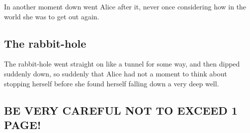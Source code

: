\documentclass[12pt]{article} %
\begin{document}
In another moment down went Alice after it, never once
considering how in the world she was to get out again.

\subsection{The rabbit-hole}

The rabbit-hole went straight on like a tunnel for some way,
and then dipped suddenly down, so suddenly that Alice had not a
moment to think about stopping herself before she found herself
falling down a very deep well.

\subsection*{BE VERY CAREFUL NOT TO EXCEED 1 PAGE!}
\end{document}
